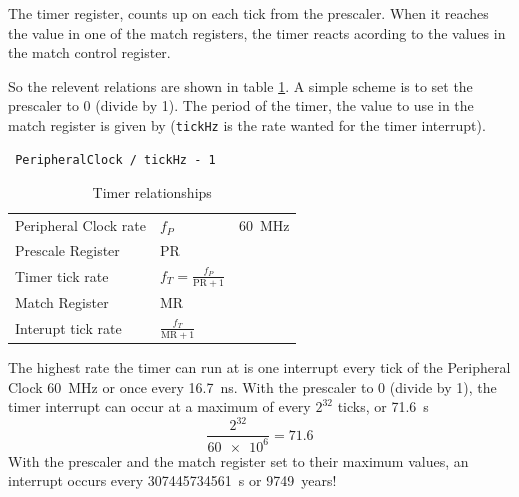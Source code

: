 \documentclass[a4paper]{tufte-handout}
\begin{document}
The timer register, counts up on each tick from the prescaler.
When it reaches the value in one of the match registers, the timer
reacts acording to the values in the match control register.

So the relevent relations are shown in table \ref{tab:timer}.
A simple scheme is to set the prescaler to 0 (divide by 1).
The period of the timer, the value to use in the match register is
given by (\texttt{tickHz} is the rate wanted for the timer interrupt).
\begin{verbatim}
 PeripheralClock / tickHz - 1 
\end{verbatim}
\begin{table}
  \begin{tabular}{lll}
    Peripheral Clock rate & $f_P$ & \SI{60}{\mega\hertz} \\
    Prescale Register & $\mathrm{PR}$ & \\
    Timer tick rate & $f_T = \frac{f_P}{\mathrm{PR}+1}$ & \\
    Match Register & $\mathrm{MR}$ & \\
    Interupt tick rate & $\frac{f_T}{\mathrm{MR}+1}$ & \\
  \end{tabular}
  \caption{Timer relationships}
  \label{tab:timer}
\end{table}
\label{sec:timer-behavior-end}
The highest rate the timer can run at is one interrupt every tick of
the Peripheral Clock \SI{60}{\mega\hertz} or once every
\SI{16.7}{\nano\second}.  With the prescaler to 0 (divide by 1), the
timer interrupt can occur at a maximum of every $2^{32}$ ticks, or \SI{71.6}{\second}
\[
\frac{2^{32}}{\num{60e6}} = 71.6
\] 
With the prescaler and the match register set to their maximum values,
an interrupt occurs every \SI{307445734561}{\second} or
\num{9749}~years!
\end{document}
